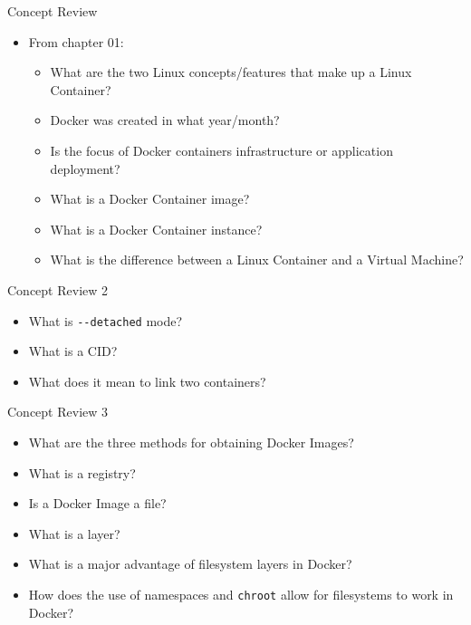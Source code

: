 \documentclass[ignorenonframetext,]{beamer}
\providecommand{\tightlist}{%
  \setlength{\itemsep}{0pt}\setlength{\parskip}{0pt}}
\begin{document}
\begin{frame}{Concept Review}
\protect\hypertarget{concept-review}{}

\begin{itemize}
\tightlist
\item
  From chapter 01:

  \begin{itemize}
  \tightlist
  \item
    What are the two Linux concepts/features that make up a Linux
    Container?
  \item
    Docker was created in what year/month?
  \item
    Is the focus of Docker containers infrastructure or application
    deployment?
  \item
    What is a Docker Container image?
  \item
    What is a Docker Container instance?
  \item
    What is the difference between a Linux Container and a Virtual
    Machine?
  \end{itemize}
\end{itemize}

\end{frame}

\begin{frame}[fragile]{Concept Review 2}
\protect\hypertarget{concept-review-2}{}

\begin{itemize}
\tightlist
\item
  What is \texttt{-\/-detached} mode?
\item
  What is a CID?
\item
  What does it mean to link two containers?
\end{itemize}

\end{frame}

\begin{frame}[fragile]{Concept Review 3}
\protect\hypertarget{concept-review-3}{}

\begin{itemize}
\tightlist
\item
  What are the three methods for obtaining Docker Images?
\item
  What is a registry?
\item
  Is a Docker Image a file?
\item
  What is a layer?
\item
  What is a major advantage of filesystem layers in Docker?
\item
  How does the use of namespaces and \texttt{chroot} allow for
  filesystems to work in Docker?
\end{itemize}

\end{frame}
\end{document}
